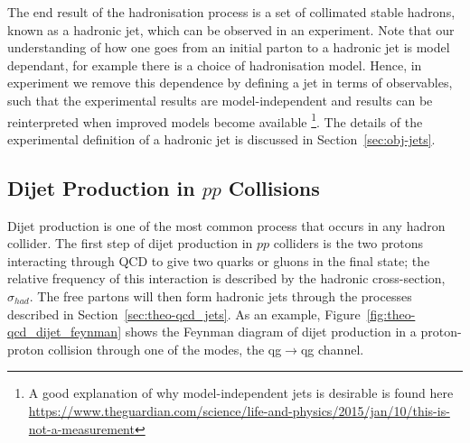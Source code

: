 The end result of the hadronisation process is a set of collimated stable hadrons,
known as a hadronic jet, which can be observed in an experiment.
Note that our understanding of how one goes from an initial parton to a hadronic jet is model dependant,
for example there is a choice of hadronisation model.
Hence, in experiment we remove this dependence by defining a jet in terms of observables,
such that the experimental results are model-independent and results can be reinterpreted when improved models become available
\footnote{A good explanation of why model-independent jets is desirable is found here \url{https://www.theguardian.com/science/life-and-physics/2015/jan/10/this-is-not-a-measurement}}.
The details of the experimental definition of a hadronic jet is discussed in Section~\ref{sec:obj-jets}.


\subsection{Dijet Production in $pp$ Collisions}
\label{sec:theo-qcd_dijet}


Dijet production is one of the most common process that occurs in any hadron collider.
The first step of dijet production in $pp$ colliders is the two protons interacting through QCD to give two quarks or gluons in the final state;
the relative frequency of this interaction is described by the hadronic cross-section, $\sigma_{had}$.
The free partons will then form hadronic jets through the processes described in Section~\ref{sec:theo-qcd_jets}.
As an example, Figure~\ref{fig:theo-qcd_dijet_feynman} shows the Feynman diagram of
dijet production in a proton-proton collision through one of the modes, the qg$\to$qg channel.

